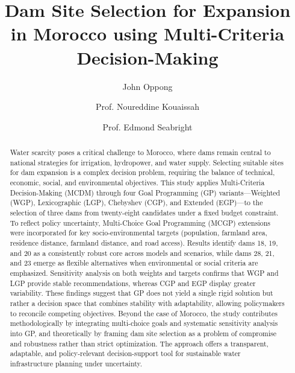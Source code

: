 \begin{frontmatter}

    \title{Dam Site Selection for Expansion in Morocco using Multi-Criteria Decision-Making}

    \author[opj]{John Oppong}
    \author[abs-supervisor]{Prof. Noureddine Kouaissah}
    \author[sci-supervisor]{Prof. Edmond Seabright}



\begin{abstract}
Water scarcity poses a critical challenge to Morocco, where dams remain central to national strategies for irrigation, hydropower, and water supply. Selecting suitable sites for dam expansion is a complex decision problem, requiring the balance of technical, economic, social, and environmental objectives. This study applies Multi-Criteria Decision-Making (MCDM) through four Goal Programming (GP) variants—Weighted (WGP), Lexicographic (LGP), Chebyshev (CGP), and Extended (EGP)—to the selection of three dams from twenty-eight candidates under a fixed budget constraint. To reflect policy uncertainty, Multi-Choice Goal Programming (MCGP) extensions were incorporated for key socio-environmental targets (population, farmland area, residence distance, farmland distance, and road access). Results identify dams 18, 19, and 20 as a consistently robust core across models and scenarios, while dams 28, 21, and 23 emerge as flexible alternatives when environmental or social criteria are emphasized. Sensitivity analysis on both weights and targets confirms that WGP and LGP provide stable recommendations, whereas CGP and EGP display greater variability. These findings suggest that GP does not yield a single rigid solution but rather a decision space that combines stability with adaptability, allowing policymakers to reconcile competing objectives. Beyond the case of Morocco, the study contributes methodologically by integrating multi-choice goals and systematic sensitivity analysis into GP, and theoretically by framing dam site selection as a problem of compromise and robustness rather than strict optimization. The approach offers a transparent, adaptable, and policy-relevant decision-support tool for sustainable water infrastructure planning under uncertainty.
\end{abstract}



\end{frontmatter}
